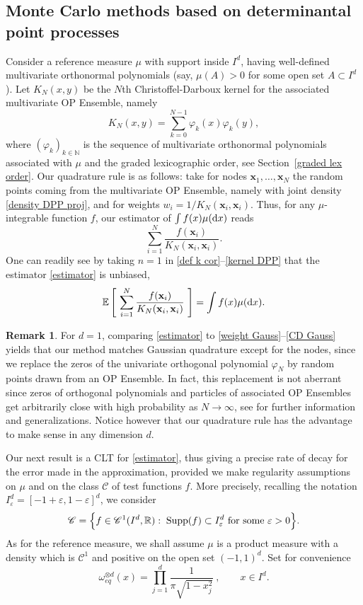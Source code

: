 \documentclass[a4paper,11pt]{article}
\numberwithin{equation}{section}
\theoremstyle{definition}
\newtheorem{Remark}[]{Remark}
\newenvironment{remark}{\begin{Remark}\rm}{\end{Remark}}
\newcommand{\eq}{\begin{equation}}
\newcommand{\qe}{\end{equation}}
\newcommand{\N}{\mathbb{N}}
\newcommand{\R}{\mathbb{R}}
\newcommand{\E}{\mathbb{E}}
\newcommand{\bv}{\mathbf}
\renewcommand{\phi}{\varphi}
\renewcommand{\epsilon}{\varepsilon}
\renewcommand{\d}{ {\rm d}}
\begin{document}
\subsection{Monte Carlo methods based on determinantal point processes}
\label{s:dppmc}
Consider a reference measure $\mu$ with support inside $I^d$, having
well-defined multivariate orthonormal polynomials (say, $\mu(A)>0$ for some open
set $A\subset I^d$). Let $K_N(x,y)$ be the $N$th Christoffel-Darboux kernel for the associated multivariate OP Ensemble, namely
\eq
K_N(x,y)=\sum_{k=0}^{N-1}\phi_k(x)\phi_k(y),
\label{e:CDKernel}
\qe
where $(\phi_k)_{k\in\N}$ is the sequence of multivariate orthonormal
polynomials associated with $\mu$ and the graded lexicographic order, see
Section~\ref{graded lex order}. Our
quadrature rule is as follows: take for nodes $\bv x_1,\ldots,\bv x_N$ the
random points coming from the multivariate OP Ensemble, namely with joint
density \eqref{density DPP proj}, and for weights $w_i=1/K_N(\bv x_i,\bv x_i)$.
Thus, for any $\mu$-integrable function $f$, our estimator of $\int f (x)\mu(\d x)$ reads
\eq
\label{estimator}
\sum_{i=1}^N \frac{f(\bv x_i)}{K_N(\bv x_i,\bv x_i)}.
\qe
One can readily see by taking $n=1$ in \eqref{def k cor}--\eqref{kernel DPP}
that the estimator \eqref{estimator} is unbiased,
\eq
\E \left[\ \sum_{i=1}^N \frac{f(\bv x_i)}{K_N(\bv x_i,\bv x_i)}\ \right] = \int f(x)\mu(\d x).
\label{e:weightedUnbiasedness}
\qe


\begin{remark} For $d=1$, comparing \eqref{estimator} to \eqref{weight
    Gauss}--\eqref{CD Gauss} yields that our method matches Gaussian quadrature
  except for the nodes, since we replace the zeros of the univariate orthogonal
  polynomial $\phi_N$ by random points drawn from an OP Ensemble. In fact, this
  replacement is not aberrant since zeros of orthogonal polynomials and
  particles of associated OP Ensembles get arbitrarily close with high
  probability as $N\to\infty$, see \citep{Har15} for further information and
  generalizations. Notice however that our quadrature rule has the advantage to
  make sense in any dimension $d$.
\label{r:gauss}
\end{remark}

Our next result is a CLT for \eqref{estimator}, thus giving a precise rate of decay for the error made in the approximation, provided we make regularity assumptions on $\mu$ and on the class $\mathscr C$ of test functions $f$. More precisely, recalling the notation $I_\epsilon^d=[-1+\epsilon,1-\epsilon]^d$, we consider
\eq
\label{class test functions}
\mathscr{C}=\Big\{ f\in \mathscr C^1(I^d,\R) :\; {\rm Supp}(f)\subset I_\epsilon^d \mbox{ for some }\epsilon>0\Big\}.
\qe
As for the reference measure, we shall assume $\mu$ is a product measure with a
density which is $\mathscr C^1$ and positive on the open set $(-1,1)^d$. Set for convenience
\eq
\label{e:muEqTenseur}
\omega_{eq}^{\otimes d}(x)=\prod_{j=1}^d\frac{1}{\pi \sqrt{1-x_j^2}} \ ,\qquad x\in I^d.
\qe
\end{document}
